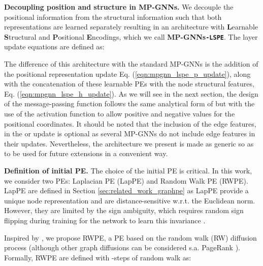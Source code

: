 \documentclass{article} \usepackage{iclr2021_conference,times}
\begin{document}
{\bf Decoupling position and structure in MP-GNNs.} We decouple the positional information from the structural information such that both representations are learned separately resulting in an architecture with \textbf{L}earnable \textbf{S}tructural and \textbf{P}ositional \textbf{E}ncodings, which we call \textbf{MP-GNNs\texttt{-LSPE}}. The layer update equations are defined as:
\vspace{-12pt}

The difference of this architecture with the standard MP-GNNs is the addition of the positional representation update Eq. (\ref{eqn:mpgnn_lspe_p_update}), along with the concatenation of these learnable PEs with the node structural features, Eq. (\ref{eqn:mpgnn_lspe_h_update}). As we will see in the next section, the design of the message-passing function  follows the same analytical form of  but with the use of the  activation function to allow positive and negative values for the positional coordinates. It should be noted that the inclusion of the edge features,  in the  or  update is optional as several MP-GNNs do not include edge features in their  updates. Nevertheless, the architecture we present is made as generic so as to be used for future extensions in a convenient way.


{\bf Definition of initial PE.}
The choice of the initial PE
is critical. In this work, we consider two PEs: Laplacian PE (LapPE) and Random Walk PE (RWPE). 
LapPE are defined in Section \ref{sec:related_work_graphpe} as 
LapPE provide a unique node representation and are distance-sensitive w.r.t. the Euclidean norm. However, they are limited by the sign ambiguity, which requires random sign flipping during training for the network to learn this invariance \citep{dwivedi2020benchmarking}. 

Inspired by \cite{li2020distance}, we propose RWPE, a PE based on the random walk (RW) diffusion process (although other graph diffusions can be considered s.a. PageRank \citep{mialon2021graphit}). Formally, RWPE are defined with -steps of random walk as:
\end{document}
